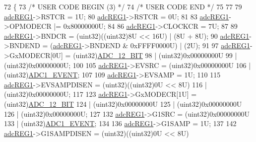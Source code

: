 \begin{DoxyCode}
72 \{
73 \textcolor{comment}{/* USER CODE BEGIN (3) */}
74 \textcolor{comment}{/* USER CODE END */}
75 
77 
79     \mbox{\hyperlink{reg__adc_8h_a3b9540af9f841ba3127f14b1c9208c57}{adcREG1}}->RSTCR = 1U;
80     \mbox{\hyperlink{reg__adc_8h_a3b9540af9f841ba3127f14b1c9208c57}{adcREG1}}->RSTCR = 0U;
81 
83     \mbox{\hyperlink{reg__adc_8h_a3b9540af9f841ba3127f14b1c9208c57}{adcREG1}}->OPMODECR |= 0x80000000U;
84     
86     \mbox{\hyperlink{reg__adc_8h_a3b9540af9f841ba3127f14b1c9208c57}{adcREG1}}->CLOCKCR = 7U;
87  
89     \mbox{\hyperlink{reg__adc_8h_a3b9540af9f841ba3127f14b1c9208c57}{adcREG1}}->BNDCR  = (uint32)((uint32)8U << 16U) | (8U + 8U);
90     \mbox{\hyperlink{reg__adc_8h_a3b9540af9f841ba3127f14b1c9208c57}{adcREG1}}->BNDEND = (\mbox{\hyperlink{reg__adc_8h_a3b9540af9f841ba3127f14b1c9208c57}{adcREG1}}->BNDEND & 0xFFFF0000U) | (2U);
91  
97     \mbox{\hyperlink{reg__adc_8h_a3b9540af9f841ba3127f14b1c9208c57}{adcREG1}}->GxMODECR[0U] = (uint32)\mbox{\hyperlink{adc_8h_acb5182ec6ffe79ad3a12c33fe2a8c6bbad68550b9c51106cbc8310d2dbd9b7a72}{ADC\_12\_BIT}}
98                           | (uint32)0x00000000U
99                           | (uint32)0x00000000U;
100 
105     \mbox{\hyperlink{reg__adc_8h_a3b9540af9f841ba3127f14b1c9208c57}{adcREG1}}->EVSRC = (uint32)0x00000000U
106                    | (uint32)\mbox{\hyperlink{adc_8h_a13aceea9ced6ca89d6c6ab3fe2ab910caadc2f5ee45815b73e5e4b86b3d75ae56}{ADC1\_EVENT}};
107 
109     \mbox{\hyperlink{reg__adc_8h_a3b9540af9f841ba3127f14b1c9208c57}{adcREG1}}->EVSAMP = 1U;
110 
115     \mbox{\hyperlink{reg__adc_8h_a3b9540af9f841ba3127f14b1c9208c57}{adcREG1}}->EVSAMPDISEN = (uint32)((uint32)0U << 8U)
116                          | (uint32)0x00000000U;
117 
123     \mbox{\hyperlink{reg__adc_8h_a3b9540af9f841ba3127f14b1c9208c57}{adcREG1}}->GxMODECR[1U] = (uint32)\mbox{\hyperlink{adc_8h_acb5182ec6ffe79ad3a12c33fe2a8c6bbad68550b9c51106cbc8310d2dbd9b7a72}{ADC\_12\_BIT}}
124                           | (uint32)0x00000000U
125                           | (uint32)0x00000000U
126                           | (uint32)0x00000000U;
127 
132     \mbox{\hyperlink{reg__adc_8h_a3b9540af9f841ba3127f14b1c9208c57}{adcREG1}}->G1SRC = (uint32)0x00000000U
133                    | (uint32)\mbox{\hyperlink{adc_8h_a13aceea9ced6ca89d6c6ab3fe2ab910caadc2f5ee45815b73e5e4b86b3d75ae56}{ADC1\_EVENT}};
134 
136     \mbox{\hyperlink{reg__adc_8h_a3b9540af9f841ba3127f14b1c9208c57}{adcREG1}}->G1SAMP = 1U;
137 
142     \mbox{\hyperlink{reg__adc_8h_a3b9540af9f841ba3127f14b1c9208c57}{adcREG1}}->G1SAMPDISEN = (uint32)((uint32)0U << 8U)

\end{DoxyCode}
